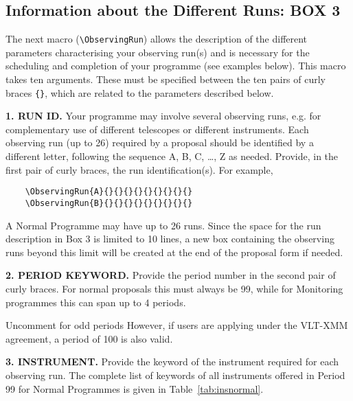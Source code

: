 \documentclass{article}
\begin{document}

\subsection{Information about the Different Runs: {\bf BOX 3}}
\label{sec:obsrun}

The next macro (\verb|\ObservingRun|) allows the description of the
different parameters characterising your observing run(s) and is
necessary for the scheduling and completion of your programme (see
examples below). This macro takes ten arguments.
These must be specified between the ten pairs of curly braces \verb|{}|, 
which are related to the parameters described below.

\medskip

{\bf 1. RUN ID.} Your programme may involve several observing
runs, e.g. for complementary use of different telescopes or
different instruments. Each observing run (up to 26) required by a
proposal should be identified by a different letter, following the
sequence A, B, C, \dots, Z as needed.  Provide, in the first pair of
curly braces, the run identification(s).  For example,
\begin{verbatim}
    \ObservingRun{A}{}{}{}{}{}{}{}{}{}
    \ObservingRun{B}{}{}{}{}{}{}{}{}{}
\end{verbatim}
A Normal Programme may have up to 26 runs. Since the space for the
run description in Box 3 is limited to 10 lines, a new box containing
the observing runs beyond this limit will be created at the end of the
proposal form if needed. 

\medskip

{\bf 2. PERIOD KEYWORD.} Provide the period number in the second pair
of curly braces.  For normal proposals this must always be 99,
while for  Monitoring programmes this can span up to 4 periods.

\ifodd\period
 Uncomment for odd periods
 However, if users are applying under the VLT-XMM agreement,
 a period of 100 is also valid.
\fi

\medskip

{\bf 3. INSTRUMENT.} Provide the keyword of the instrument required
for each observing run. The complete list of keywords of all
instruments offered in Period 99 for Normal Programmes is
given in Table~\ref{tab:insnormal}. 
\end{document}
